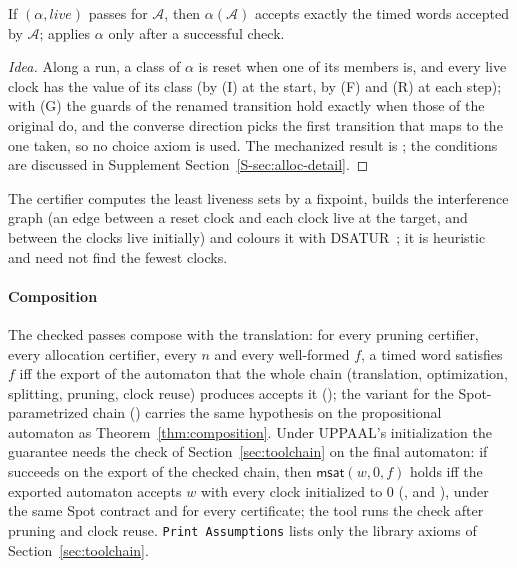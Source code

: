 \begin{theorem}
\label{thm:reuse}
If $(\alpha,\mathit{live})$ passes  for $\mathcal A$, then $\alpha(\mathcal A)$ accepts exactly the timed words accepted by $\mathcal A$;  applies $\alpha$ only after a successful check.
\end{theorem}
\begin{proof}[Idea]
Along a run, a class of $\alpha$ is reset when one of its members is, and every live clock has the value of its class (by (I) at the start, by (F) and (R) at each step); with (G) the guards of the renamed transition hold exactly when those of the original do, and the converse direction picks the first transition that maps to the one taken, so no choice axiom is used. The mechanized result is ; the conditions are discussed in Supplement Section~\ref{S-sec:alloc-detail}.
\end{proof}

The certifier computes the least liveness sets by a fixpoint, builds the interference graph (an edge between a reset clock and each clock live at the target, and between the clocks live initially) and colours it with DSATUR~\cite{brelaz_cacm79}; it is heuristic and need not find the fewest clocks.

\paragraph{Composition} The checked passes compose with the translation: for every pruning certifier, every allocation certifier, every $n$ and every well-formed $f$, a timed word satisfies $f$ iff the export of the automaton that the whole chain (translation, optimization, splitting, pruning, clock reuse) produces accepts it (); the variant for the Spot-parametrized chain () carries the same hypothesis on the propositional automaton as Theorem~\ref{thm:composition}. Under UPPAAL's initialization the guarantee needs the check of Section~\ref{sec:toolchain} on the final automaton: if  succeeds on the export of the checked chain, then $\mathsf{msat}(w,0,f)$ holds iff the exported automaton accepts $w$ with every clock initialized to 0 (, and ), under the same Spot contract and for every certificate; the tool runs the check after pruning and clock reuse. \texttt{Print Assumptions} lists only the library axioms of Section~\ref{sec:toolchain}.

